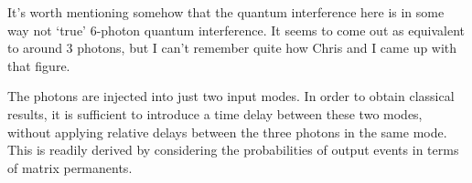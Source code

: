 It's worth mentioning somehow that the quantum interference here is in some way
not `true' 6-photon quantum interference. It seems to come out as equivalent to
around 3 photons, but I can't remember quite how Chris and I came up with that
figure.

The photons are injected into just two input modes. In order to obtain classical
results, it is sufficient to introduce a time delay between these two modes,
without applying relative delays between the three photons in the same mode.
This is readily derived by considering the probabilities of output events in
terms of matrix permanents.
